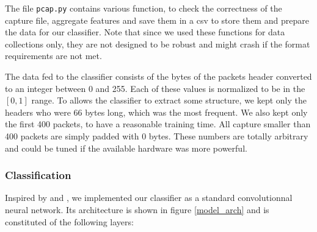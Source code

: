 \documentclass[10pt,conference,compsocconf]{IEEEtran}
\begin{document}
The file \verb|pcap.py| contains various function, to check the correctness of the capture file, aggregate features and save them in a csv to store them and prepare the data for our classifier. Note that since we used these functions for data collections only, they are not designed to be robust and might crash if the format requirements are not met. 

The data fed to the classifier consists of the bytes of the packets header converted to an integer between 0 and 255. Each of these values is normalized to be in the $[0,1]$ range. To allows the classifier to extract some structure, we kept only the headers who were 66 bytes long, which was the most frequent. We also kept only the first 400 packets, to have a reasonable training time. All capture smaller than 400 packets are simply padded with 0 bytes. These numbers are totally arbitrary and could be tuned if the available hardware was more powerful.

\subsubsection{Classification}
Inspired by \cite{tor_classification} and \cite{dl_encrypted}, we implemented our classifier as a standard convolutionnal neural network. Its architecture is shown in figure \ref{model_arch} and is constituted of the following layers:
\end{document}
